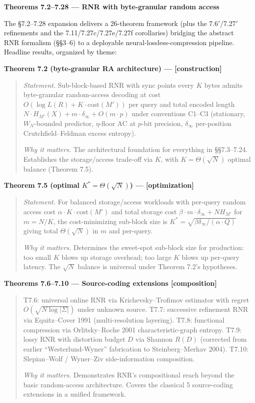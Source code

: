 \documentclass[
]{article}
\begin{document}
\textbf{Theorems 7.2--7.28 --- RNR with byte-granular random access}

The §7.2--7.28 expansion delivers a 26-theorem framework (plus the
7.6$'$/7.27$'$ refinements and the 7.11/7.27c/7.27e/7.27f corollaries)
bridging the abstract RNR formalism (§§3--6) to a deployable
neural-lossless-compression pipeline. Headline results, organized by
theme:

\textbf{Theorem 7.2 (byte-granular RA architecture) --- {[}construction{]}}

\begin{quote}
\emph{Statement.} Sub-block-based RNR with sync points every $K$
bytes admits byte-granular random-access decoding at cost
$O(\log L(R) + K \cdot \mathrm{cost}(M'))$ per query and total
encoded length $N \cdot H_{M'}(X) + m \cdot \delta_\infty + O(m \cdot p)$
under conventions C1--C3 (stationary, $W_N$-bounded predictor,
$\eta$-floor AC at $p$-bit precision, $\delta_\infty$ per-position
Crutchfield--Feldman excess entropy).

\emph{Why it matters.} The architectural foundation for everything in
§§7.3--7.24. Establishes the storage/access trade-off via $K$, with
$K = \Theta(\sqrt{N})$ optimal balance (Theorem 7.5).
\end{quote}

\textbf{Theorem 7.5 (optimal $K^\ast = \Theta(\sqrt{N})$) ---
{[}optimization{]}}

\begin{quote}
\emph{Statement.} For balanced storage/access workloads with per-query
random access cost $\alpha \cdot K \cdot \mathrm{cost}(M')$ and total
storage cost $\beta \cdot m \cdot \delta_\infty + N H_{M'}$ for
$m = N/K$, the cost-minimizing sub-block size is
$K^\ast = \sqrt{\beta \delta_\infty / (\alpha \cdot Q)}$ giving
total $\Theta(\sqrt{N})$ in $m$ and per-query.

\emph{Why it matters.} Determines the sweet-spot sub-block size for
production: too small $K$ blows up storage overhead; too large $K$
blows up per-query latency. The $\sqrt{N}$ balance is universal under
Theorem 7.2's hypotheses.
\end{quote}

\textbf{Theorems 7.6--7.10 --- Source-coding extensions
{[}composition{]}}

\begin{quote}
T7.6: universal online RNR via Krichevsky--Trofimov estimator with
regret $O(\sqrt{N \log |\Sigma|})$ under unknown source. T7.7:
successive refinement RNR via Equitz--Cover 1991 (multi-resolution
layering). T7.8: functional compression via Orlitsky--Roche 2001
characteristic-graph entropy. T7.9: lossy RNR with distortion budget
$D$ via Shannon $R(D)$ (corrected from earlier ``Westerlund-Wyner''
fabrication to Steinberg--Merhav 2004). T7.10: Slepian--Wolf /
Wyner--Ziv side-information composition.

\emph{Why it matters.} Demonstrates RNR's compositional reach beyond
the basic random-access architecture. Covers the classical 5
source-coding extensions in a unified framework.
\end{quote}
\end{document}
